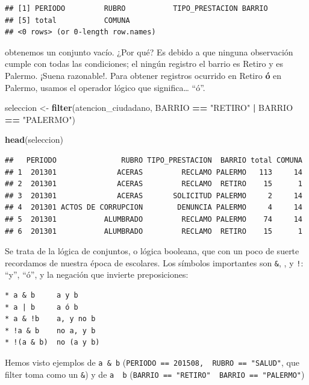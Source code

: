 \documentclass[spanish,]{book}
\newenvironment{Shaded}{\begin{snugshade}}{\end{snugshade}}
\newcommand{\KeywordTok}[1]{\textcolor[rgb]{0.13,0.29,0.53}{\textbf{#1}}}
\newcommand{\NormalTok}[1]{#1}
\newcommand{\OperatorTok}[1]{\textcolor[rgb]{0.81,0.36,0.00}{\textbf{#1}}}
\newcommand{\StringTok}[1]{\textcolor[rgb]{0.31,0.60,0.02}{#1}}
\begin{document}
\begin{verbatim}
## [1] PERIODO         RUBRO           TIPO_PRESTACION BARRIO         
## [5] total           COMUNA         
## <0 rows> (or 0-length row.names)
\end{verbatim}

obtenemos un conjunto vacío. ¿Por qué? Es debido a que ninguna observación cumple con todas las condiciones; el ningún registro el barrio es Retiro y es Palermo. ¡Suena razonable!. Para obtener registros ocurrido en Retiro \textbf{ó} en Palermo, usamos el operador lógico \texttt{\textbar{}} que significa\ldots{} ``ó''.

\begin{Shaded}
\begin{Highlighting}[]
\NormalTok{seleccion <-}\StringTok{ }\KeywordTok{filter}\NormalTok{(atencion_ciudadano, BARRIO }\OperatorTok{==}\StringTok{ "RETIRO"} \OperatorTok{|}\StringTok{ }\NormalTok{BARRIO }\OperatorTok{==}\StringTok{ "PALERMO"}\NormalTok{)}

\KeywordTok{head}\NormalTok{(seleccion)}
\end{Highlighting}
\end{Shaded}

\begin{verbatim}
##   PERIODO               RUBRO TIPO_PRESTACION  BARRIO total COMUNA
## 1  201301              ACERAS         RECLAMO PALERMO   113     14
## 2  201301              ACERAS         RECLAMO  RETIRO    15      1
## 3  201301              ACERAS       SOLICITUD PALERMO     2     14
## 4  201301 ACTOS DE CORRUPCION        DENUNCIA PALERMO     4     14
## 5  201301           ALUMBRADO         RECLAMO PALERMO    74     14
## 6  201301           ALUMBRADO         RECLAMO  RETIRO    15      1
\end{verbatim}

Se trata de la lógica de conjuntos, o lógica booleana, que con un poco de suerte recordamos de nuestra época de escolares. Los símbolos importantes son \texttt{\&}, \texttt{\textbar{}}, y \texttt{!}: ``y'', ``ó'', y la negación que invierte preposiciones:

\begin{verbatim}
* a & b     a y b
* a | b     a ó b
* a & !b    a, y no b
* !a & b    no a, y b
* !(a & b)  no (a y b) 
\end{verbatim}

Hemos visto ejemplos de \texttt{a\ \&\ b} (\texttt{PERIODO\ ==\ 201508,\ \ RUBRO\ ==\ "SALUD"}, que filter toma como un \texttt{\&}) y de \texttt{a\ \textbar{}\ b} (\texttt{BARRIO\ ==\ "RETIRO"\ \textbar{}\ BARRIO\ ==\ "PALERMO"})
\end{document}
